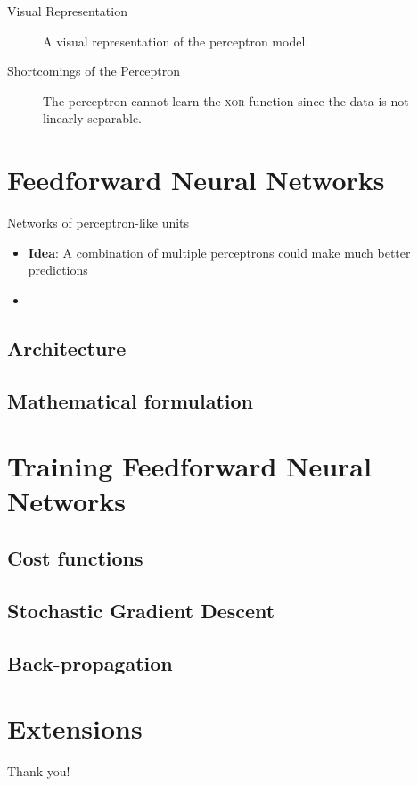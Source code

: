 \documentclass{beamer}
\begin{document}
	\begin{frame}{Visual Representation}
		\begin{figure}
			
			\caption{A visual representation of the perceptron model.}
		\end{figure}
	\end{frame}
	\begin{frame}{Shortcomings of the Perceptron}
		\begin{figure}
						
			\caption{The perceptron cannot learn the \textsc{xor} function since the data is not linearly separable.}
		\end{figure}
	\end{frame}
	
	\section{Feedforward Neural Networks}
	
	\begin{frame}{Networks of perceptron-like units}
		\begin{itemize}
			\item <1-> \textbf{Idea}: A combination of multiple perceptrons could make much better predictions
			\item <2-> 
		\end{itemize}
	\end{frame}
	\subsection{Architecture}
	\subsection{Mathematical formulation}
	\section{Training Feedforward Neural Networks}
	\subsection{Cost functions}
	\subsection{Stochastic Gradient Descent}
	\subsection{Back-propagation}
	\section{Extensions}
	
	\begin{frame}[standout]
	Thank you!
	\end{frame}
	
\end{document}
